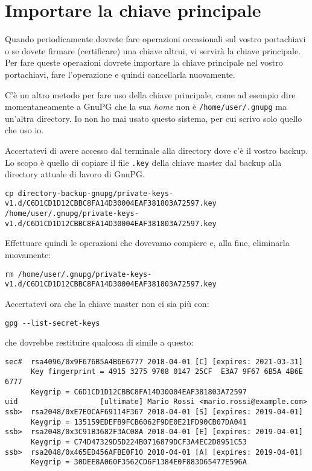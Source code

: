 \section{Importare la chiave principale} \label{importare-chiave}

Quando periodicamente dovrete fare operazioni occasionali sul vostro portachiavi
o se dovete firmare (certificare) una chiave altrui, vi servirà la chiave
principale. Per fare queste operazioni dovrete importare la chiave principale
nel vostro portachiavi, fare l'operazione e quindi cancellarla nuovamente.

C'è un altro metodo per fare uso della chiave principale, come ad esempio dire
momentaneamente a GnuPG che la sua \emph{home} non è \texttt{/home/user/.gnupg}
ma un'altra directory. Io non ho mai usato questo sistema, per cui scrivo solo
quello che uso io.

Accertatevi di avere accesso dal terminale alla directory dove c'è il vostro
backup. Lo scopo è quello di copiare il file \texttt{.key} della chiave master
dal backup alla directory attuale di lavoro di GnuPG.

\begin{lstlisting}
cp directory-backup-gnupg/private-keys-v1.d/C6D1CD1D12CBBC8FA14D30004EAF381803A72597.key /home/user/.gnupg/private-keys-v1.d/C6D1CD1D12CBBC8FA14D30004EAF381803A72597.key
\end{lstlisting}

Effettuare quindi le operazioni che dovevamo compiere e, alla fine, eliminarla
nuovamente:

\begin{lstlisting}
rm /home/user/.gnupg/private-keys-v1.d/C6D1CD1D12CBBC8FA14D30004EAF381803A72597.key
\end{lstlisting}

Accertatevi ora che la chiave master non ci sia più con:

\begin{lstlisting}
gpg --list-secret-keys
\end{lstlisting}

che dovrebbe restituire qualcosa di simile a questo:

\begin{lstlisting}
sec#  rsa4096/0x9F676B5A4B6E6777 2018-04-01 [C] [expires: 2021-03-31]
      Key fingerprint = 4915 3275 9708 0147 25CF  E3A7 9F67 6B5A 4B6E 6777
      Keygrip = C6D1CD1D12CBBC8FA14D30004EAF381803A72597
uid                   [ultimate] Mario Rossi <mario.rossi@example.com>
ssb>  rsa2048/0xE7E0CAF69114F367 2018-04-01 [S] [expires: 2019-04-01]
      Keygrip = 135159EDEFB9FCB6062F9DE0E21FD90CB07DA041
ssb>  rsa2048/0x3C91B3682F3AC08A 2018-04-01 [E] [expires: 2019-04-01]
      Keygrip = C74D47329D5D224B0716879DCF3A4EC2D8951C53
ssb>  rsa2048/0x465ED456AFBE0F10 2018-04-01 [A] [expires: 2019-04-01]
      Keygrip = 30DEE8A060F3562CD6F1384E0F883D65477E596A
\end{lstlisting}

